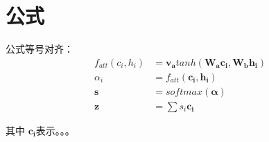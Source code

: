 \documentclass[UTF8,12pt]{article} %
\begin{document}
\section{公式}
公式等号对齐：
\begin{align}
  f_{att}(c_i, h_i) &= \boldsymbol{v_a}tanh(\boldsymbol{W_ac_i},\boldsymbol{W_bh_i})\\
  \alpha_i &= f_{att}(\boldsymbol{c_i}, \boldsymbol{h_i})\\
  \boldsymbol{s} &= softmax(\boldsymbol{\alpha})\\
  \boldsymbol{z} &= \sum{s_i\boldsymbol{c_i}}  
\end{align}

  其中 $\boldsymbol{c_i}$表示。。。




\end{document}
